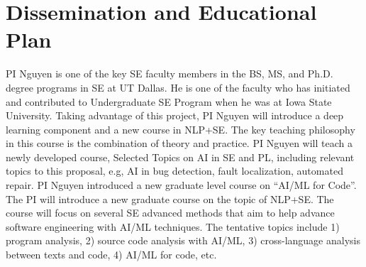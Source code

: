 \section{Dissemination and Educational Plan}
\label{edu}



PI Nguyen is one of the key SE faculty members in the BS, MS, and Ph.D.
degree programs in SE at UT Dallas. 
%
He is one of the faculty who has initiated and contributed to
Undergraduate SE Program when he was at Iowa State University.
Taking advantage of this project, PI Nguyen will introduce a deep
learning component and a new course in NLP+SE.
The key teaching philosophy in this course is the combination of theory and practice.
PI Nguyen will teach a newly developed course, 
Selected Topics on AI in SE and PL,
including relevant topics to this proposal, e.g, 
AI in bug detection, fault localization, automated repair. 
PI Nguyen introduced a new graduate level course on ``AI/ML for
Code''. The PI will introduce a new graduate course on the topic of
NLP+SE.
The course will focus on several SE advanced methods that
aim to help advance software engineering with AI/ML techniques. 
The tentative topics include 1) program analysis, 2) source code
analysis with AI/ML, 3) cross-language analysis between texts and code,
4) AI/ML for code, etc.




